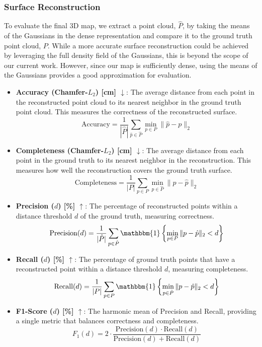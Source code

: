\subsubsection{Surface Reconstruction}
To evaluate the final 3D map, we extract a point cloud, $\hat{P}$, by taking the means of the Gaussians in the dense representation and compare it to the ground truth point cloud, $P$. While a more accurate surface reconstruction could be achieved by leveraging the full density field of the Gaussians, this is beyond the scope of our current work. However, since our map is sufficiently dense, using the means of the Gaussians provides a good approximation for evaluation.
\begin{itemize}
	\item \textbf{Accuracy (Chamfer-$L_2$) [cm] $\downarrow$}: The average distance from each point in the reconstructed point cloud to its nearest neighbor in the ground truth point cloud. This measures the correctness of the reconstructed surface.
	      \begin{equation}
		      \text{Accuracy} = \frac{1}{|\hat{P}|} \sum_{\hat{p} \in \hat{P}} \min_{p \in P} \|\hat{p} - p\|_2
	      \end{equation}

	\item \textbf{Completeness (Chamfer-$L_2$) [cm] $\downarrow$}: The average distance from each point in the ground truth to its nearest neighbor in the reconstruction. This measures how well the reconstruction covers the ground truth surface.
	      \begin{equation}
		      \text{Completeness} = \frac{1}{|P|} \sum_{p \in P} \min_{p \in \hat{P}} \|p - \hat{p}\|_2
	      \end{equation}

	\item \textbf{Precision ($d$) [\%] $\uparrow$}: The percentage of reconstructed points within a distance threshold $d$ of the ground truth, measuring correctness.
	      \begin{equation}
		      \text{Precision}(d) = \frac{1}{|\hat{P}|} \sum_{p \in \hat{P}} \mathbbm{1}\left\{\min_{p \in P} \|p - \hat{p}\|_2 < d\right\}
	      \end{equation}

	\item \textbf{Recall ($d$) [\%] $\uparrow$}: The percentage of ground truth points that have a reconstructed point within a distance threshold $d$, measuring completeness.
	      \begin{equation}
		      \text{Recall}(d) = \frac{1}{|P|} \sum_{p \in P} \mathbbm{1}\left\{\min_{p \in \hat{P}} \|p - \hat{p}\|_2 < d\right\}
	      \end{equation}

	\item \textbf{F1-Score ($d$) [\%] $\uparrow$}: The harmonic mean of Precision and Recall, providing a single metric that balances correctness and completeness.
	      \begin{equation}
		      F_1(d) = 2 \cdot \frac{\text{Precision}(d) \cdot \text{Recall}(d)}{\text{Precision}(d) + \text{Recall}(d)}
	      \end{equation}
\end{itemize}
